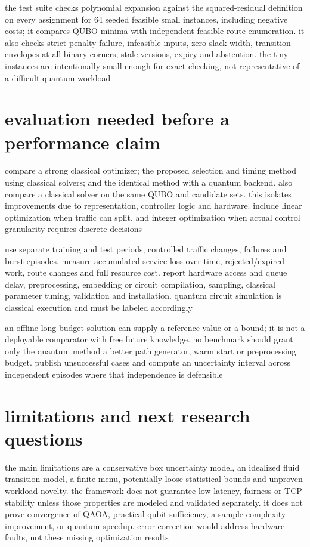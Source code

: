 \documentclass[11pt,a4paper]{article}
\newcommand{\1}{\mathbf{1}}
\begin{document}
the test suite checks polynomial expansion against the squared-residual definition on every assignment for 64 seeded feasible small instances, including negative costs; it compares QUBO minima with independent feasible route enumeration. it also checks strict-penalty failure, infeasible inputs, zero slack width, transition envelopes at all binary corners, stale versions, expiry and abstention. the tiny instances are intentionally small enough for exact checking, not representative of a difficult quantum workload

\section{evaluation needed before a performance claim}
compare a strong classical optimizer; the proposed selection and timing method using classical solvers; and the identical method with a quantum backend. also compare a classical solver on the same QUBO and candidate sets. this isolates improvements due to representation, controller logic and hardware. include linear optimization when traffic can split, and integer optimization when actual control granularity requires discrete decisions

use separate training and test periods, controlled traffic changes, failures and burst episodes. measure accumulated service loss over time, rejected/expired work, route changes and full resource cost. report hardware access and queue delay, preprocessing, embedding or circuit compilation, sampling, classical parameter tuning, validation and installation. quantum circuit simulation is classical execution and must be labeled accordingly

an offline long-budget solution can supply a reference value or a bound; it is not a deployable comparator with free future knowledge. no benchmark should grant only the quantum method a better path generator, warm start or preprocessing budget. publish unsuccessful cases and compute an uncertainty interval across independent episodes where that independence is defensible

\section{limitations and next research questions}
the main limitations are a conservative box uncertainty model, an idealized fluid transition model, a finite menu, potentially loose statistical bounds and unproven workload novelty. the framework does not guarantee low latency, fairness or TCP stability unless those properties are modeled and validated separately. it does not prove convergence of QAOA, practical qubit sufficiency, a sample-complexity improvement, or quantum speedup. error correction would address hardware faults, not these missing optimization results
\end{document}

